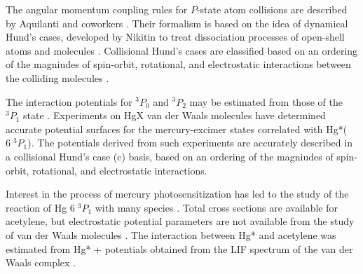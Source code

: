 \documentclass[12pt]{mitthesis}
\begin{document}
The angular momentum coupling rules for $P$-state atom collisions are
described by Aquilanti and coworkers \cite{aquilanti80a,
  aquilanti80b}.  Their formalism is based on the idea of dynamical
Hund's cases, developed by Nikitin to treat dissociation processes of
open-shell atoms and molecules \cite{nikitin65}.
Collisional Hund's cases are classified based on an ordering of the
magniudes of spin-orbit, rotational, and electrostatic interactions
between the colliding molecules \cite{nikitin94}.

The interaction potentials for $^3P_0$ and $^3P_2$ may be estimated
from those of the $^3P_1$ state \cite{zagrebin95}.  Experiments on HgX
van der Waals molecules have determined accurate potential surfaces
for the mercury-excimer states correlated with Hg*($6\;^3P_1$).  The
potentials derived from such experiments are accurately described in a
collisional Hund's case (c) basis, based on an ordering of the
magniudes of spin-orbit, rotational, and electrostatic interactions.

Interest in the process of mercury photosensitization has led to the
study of the reaction of Hg $6 \; ^3P_1$ with many species
\cite{duval91, ohmori96}.  Total cross sections are available for
acetylene, but electrostatic potential parameters are not available
from the study of van der Waals molecules .  The interaction between Hg* and acetylene was
estimated from Hg* +  potentials obtained from the LIF spectrum
of the  van der Waals complex \cite{yamanouchi88}.
\end{document}
